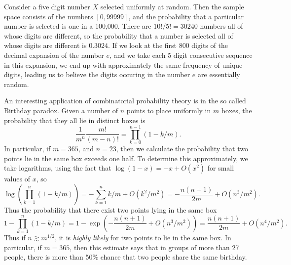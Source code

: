 \begin{example}
    Consider a five digit number $X$ selected uniformly at random. Then the sample space consists of the numbers $[0,99999]$, and the probability that a particular number is selected is one in a 100,000. There are $10!/5! = 30240$ numbers all of whose digits are different, so the probability that a number is selected all of whose digits are different is $0.3024$. If we look at the first 800 digits of the decimal expansion of the number $e$, and we take each 5 digit consecutive sequence in this expansion, we end up with approximately the same frequency of unique digits, leading us to believe the digits occuring in the number $e$ are essentially random.
\end{example}

\begin{example}
    An interesting application of combinatorial probability theory is in the so called Birthday paradox. Given a number of $n$ points to place uniformly in $m$ boxes, the probability that they all lie in distinct boxes is
    \[ \frac{1}{m^n} \frac{m!}{(m-n)!} = \prod_{k = 0}^{n-1} (1 - k/m). \]
    In particular, if $m = 365$, and $n = 23$, then we calculate the probability that two points lie in the same box exceeds one half. To determine this approximately, we take logarithms, using the fact that $\log(1 - x) = -x + O(x^2)$ for small values of $x$, so
    \[ \log \left( \prod_{k = 1}^n (1 - k/m) \right) = - \sum_{k = 1}^n k/m + O(k^2/m^2) = - \frac{n(n+1)}{2m} + O(n^3/m^2). \]
    Thus the probability that there exist two points lying in the same box
    \[ 1 - \prod_{k = 1}^n (1 - k/m) = 1 - \exp \left( - \frac{n(n+1)}{2m} + O(n^3/m^2) \right) = \frac{n(n+1)}{2m} + O(n^4/m^2). \]
    Thus if $n \gtrsim m^{1/2}$, it is {\it highly likely} for two points to lie in the same box. In particular, if $m = 365$, then this estimate says that in groups of more than 27 people, there is more than 50\% chance that two people share the same birthday.
\end{example}

